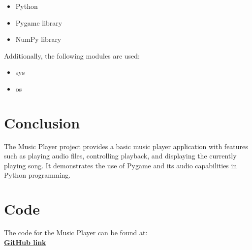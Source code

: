 \documentclass[journal,12pt,twocolumn]{IEEEtran}
\begin{document}
\begin{itemize}
\item Python 
\item Pygame library
\item NumPy library
\end{itemize}

Additionally, the following modules are used:

\begin{itemize}
        \item sys
        \item os
\end{itemize}

\section{Conclusion}
The Music Player project provides a basic music player application with features such as playing audio files, controlling playback, and displaying the currently playing song. It demonstrates the use of Pygame and its audio capabilities in Python programming.

\section{Code}
The code for the Music Player can be found at:\\
\textcolor{blue}{\href{https://github.com/Uttam-Paharia/Probability/tree/main/pythonproject}{\textbf{GitHub link}}}
\end{document}
